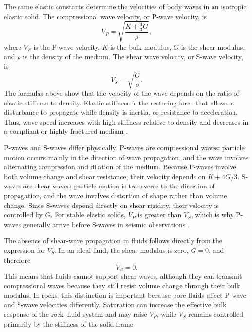 The same elastic constants determine the velocities of body waves in an isotropic elastic solid. The compressional wave velocity, or P-wave velocity, is
\begin{equation}
V_P =
\sqrt{
\frac{K + \frac{4}{3}G}{\rho}
},
\end{equation}
where \(V_P\) is the P-wave velocity, \(K\) is the bulk modulus, \(G\) is the shear modulus, and \(\rho\) is the density of the medium. The shear wave velocity, or S-wave velocity, is
\begin{equation}
V_S =
\sqrt{
\frac{G}{\rho}
}.
\end{equation}
The formulas above show that the velocity of the wave depends on the ratio of elastic stiffness to density. Elastic stiffness is the restoring force that allows a disturbance to propagate while density is inertia, or resistance to acceleration. Thus, wave speed increases with high stiffness relative to density and decreases in a compliant or highly fractured medium \cite{aki2002,mavko2009}.

P-waves and S-waves differ physically. P-waves are compressional waves: particle motion occurs mainly in the direction of wave propagation, and the wave involves alternating compression and dilation of the medium. Because P-waves involve both volume change and shear resistance, their velocity depends on \(K + 4G/3\). S-waves are shear waves: particle motion is transverse to the direction of propagation, and the wave involves distortion of shape rather than volume change. Since S-waves depend directly on shear rigidity, their velocity is controlled by \(G\). For stable elastic solids, \(V_P\) is greater than \(V_S\), which is why P-waves generally arrive before S-waves in seismic observations \cite{aki2002,openstax-waves,feynman}.

The absence of shear-wave propagation in fluids follows directly from the expression for \(V_S\). In an ideal fluid, the shear modulus is zero, \(G=0\), and therefore
\begin{equation}
V_S = 0.
\end{equation}
This means that fluids cannot support shear waves, although they can transmit compressional waves because they still resist volume change through their bulk modulus. In rocks, this distinction is important because pore fluids affect P-wave and S-wave velocities differently. Saturation can increase the effective bulk response of the rock--fluid system and may raise \(V_P\), while \(V_S\) remains controlled primarily by the stiffness of the solid frame \cite{aki2002,mavko2009}.

